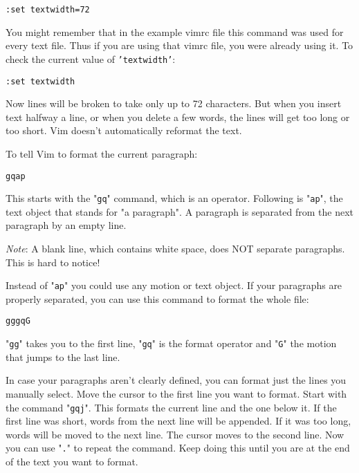 {\begin{Verbatim}[samepage=true]
 :set textwidth=72
\end{Verbatim}

You might remember that in the example vimrc file this command was used for every text file.
Thus if you are using that vimrc file, you were already using it.
To check the current value of \texttt{'textwidth'}:

\begin{Verbatim}[samepage=true]
 :set textwidth
\end{Verbatim}

Now lines will be broken to take only up to 72 characters.
But when you insert text halfway a line, or when you delete a few words, the lines will get too long or too short.
Vim doesn't automatically reformat the text.

To tell Vim to format the current paragraph:

\begin{Verbatim}[samepage=true]
 gqap
\end{Verbatim}

This starts with the "\texttt{gq}" command, which is an operator.
Following is "\texttt{ap}", the text object that stands for "a paragraph".
A paragraph is separated from the next paragraph by an empty line.

\emph{Note}:
A blank line, which contains white space, does NOT separate paragraphs.
This is hard to notice!

Instead of "\texttt{ap}" you could use any motion or text object.
If your paragraphs are properly separated, you can use this command to format the whole file:

\begin{Verbatim}[samepage=true]
 gggqG
\end{Verbatim}

"\texttt{gg}" takes you to the first line, "\texttt{gq}" is the format operator and "\texttt{G}" the motion that jumps to the last line.

In case your paragraphs aren't clearly defined, you can format just the lines you manually select.
Move the cursor to the first line you want to format.
Start with the command "\texttt{gqj}".
This formats the current line and the one below it.
If the first line was short, words from the next line will be appended.
If it was too long, words will be moved to the next line.
The cursor moves to the second line.
Now you can use "\texttt{.}" to repeat the command.
Keep doing this until you are at the end of the text you want to format.

}
